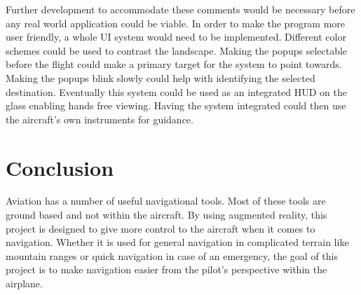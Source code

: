 \documentclass[journal]{vgtc}                %
\begin{document}
Further development to accommodate these comments would be necessary before any real world application could be viable. In order to make the program more user friendly, a whole UI system would need to be implemented. Different color schemes could be used to contrast the landscape. Making the popups selectable before the flight could make a primary target for the system to point towards. Making the popups blink slowly could help with identifying the selected destination. Eventually this system could be used as an integrated HUD on the glass enabling hands free viewing. Having the system integrated could then use the aircraft’s own instruments for guidance.


\section{Conclusion}

Aviation has a number of useful navigational tools. Most of these tools are ground based and not within the aircraft. By using augmented reality, this project is designed to give more control to the aircraft when it comes to navigation. Whether it is used for general navigation in complicated terrain like mountain ranges or quick navigation in case of an emergency, the goal of this project is to make navigation easier from the pilot’s perspective within the airplane.


%

%
%
%


\end{document}
